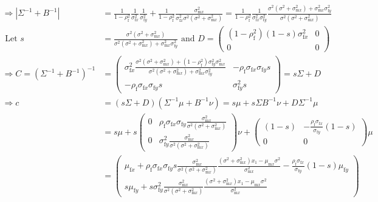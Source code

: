 \documentclass{article}
\newcommand{\x}[1]{\text{#1}}
\begin{document}
\begin{landscape}
\begin{align*}
\\ \Rightarrow |\Sigma^{-1}+B^{-1}| &=\frac{1}{1-\rho_\x{f}^2}\frac{1}{\sigma_{\x{f}x}^2}\frac{1}{\sigma_{\x{f}y}^2}+\frac{1}{1-\rho_\x{f}^2}\frac{\sigma_{\x{m}x}^2}{\sigma_{\x{f}x}^2\sigma^2(\sigma^2+\sigma_{\x{m}x}^2)}=\frac{1}{1-\rho_\x{f}^2}\frac{1}{\sigma_{\x{f}x}^2\sigma_{\x{f}y}^2}\frac{\sigma^2(\sigma^2+\sigma_{\x{m}x}^2)+\sigma_{\x{m}x}^2\sigma_{\x{f}y}^2}{\sigma^2(\sigma^2+\sigma_{\x{m}x}^2)}
\\ \text{ Let } s&=\frac{\sigma^2(\sigma^2+\sigma_{\x{m}x}^2)}{\sigma^2(\sigma^2+\sigma_{\x{m}x}^2)+\sigma_{\x{m}x}^2\sigma_{\x{f}y}^2} \text{ and } D = \left(\begin{array}{cc} (1-\rho_\x{f}^2)(1-s)\sigma_{\x{f}x}^2 & 0 \\ 0 & 0 \end{array}\right)
\\ \Rightarrow C=(\Sigma^{-1}+B^{-1})^{-1} &= \left(\begin{array}{cc}\sigma_{\x{f}x}^2\frac{\sigma^2(\sigma^2+\sigma_{\x{m}x}^2)+(1-\rho_\x{f}^2)\sigma_{\x{f}y}^2\sigma_{\x{m}x}^2}{\sigma^2(\sigma^2+\sigma_{\x{m}x}^2)+\sigma_{\x{m}x}^2\sigma_{\x{f}y}^2} & -\rho_\x{f}\sigma_{\x{f}x}\sigma_{\x{f}y}s \\ -\rho_{\x{f}}\sigma_{\x{f}x}\sigma_{\x{f}y}s & \sigma_{\x{f}y}^2s \end{array}\right)=s\Sigma + D
\\ \Rightarrow c & = (s\Sigma+D)(\Sigma^{-1}\mu+B^{-1}\nu)=s\mu+s\Sigma B^{-1}\nu+D\Sigma^{-1}\mu
\\&=s\mu+s\left(\begin{array}{cc}0 & \rho_\x{f}\sigma_{\x{f}x}\sigma_{\x{f}y}\frac{\sigma_{\x{m}x}^2}{\sigma^2(\sigma^2+\sigma_{\x{m}x}^2)} \\ 0 & \sigma_{\x{f}y}^2\frac{\sigma_{\x{m}x}^2}{\sigma^2(\sigma^2+\sigma_{\x{m}x}^2)} \end{array}\right)\nu + \left(\begin{array}{cc}(1-s) & -\frac{\rho_\x{f}\sigma_{\x{f}x}}{\sigma_{\x{f}y}}(1-s) \\ 0 & 0 \end{array}\right)\mu
\\&=\left(\begin{array}{cc}\mu_{\x{f}x}+\rho_\x{f}\sigma_{\x{f}x}\sigma_{\x{f}y}s\frac{\sigma_{\x{m}x}^2}{\sigma^2(\sigma^2+\sigma_{\x{m}x}^2)}\frac{(\sigma^2+\sigma_{\x{m}x}^2)x_1-\mu_{\x{m}x}\sigma^2}{\sigma_{\x{m}x}^2}-\frac{\rho_\x{f}\sigma_{\x{f}x}}{\sigma_{\x{f}y}}(1-s)\mu_{\x{f}y} \\ s\mu_{\x{f}y}+s\sigma_{\x{f}y}^2\frac{\sigma_{\x{m}x}^2}{\sigma^2(\sigma^2+\sigma_{\x{m}x}^2)}\frac{(\sigma^2+\sigma_{\x{m}x}^2)x_1-\mu_{\x{m}x}\sigma^2}{\sigma_{\x{m}x}^2} \end{array}\right)

\end{align*}
\end{landscape}
\end{document}
